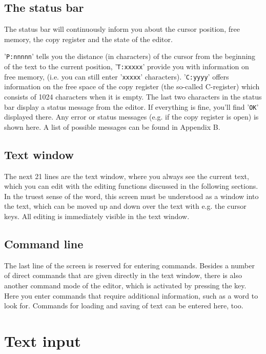 \documentclass[10pt,a4paper,twoside,final,openright,titlepage]{memoir}
\newcommand{\key}[1]{\keystroke{\tiny #1}}
\begin{document}
\subsection{The status bar}

The status bar will continuously inform you about the cursor position, free memory, the copy register
and the state of the editor.

'\texttt {P:nnnnn}' tells you the distance (in characters) of the cursor from the beginning of the text
to the current position,
'\texttt {T:xxxxx}' provide you with information on free memory, (i.e. you can still enter
'\texttt {xxxxx}' characters).
'\texttt {C:yyyy}' offers information on the free space of the copy register (the so-called C-register) 
which consists of 1024 characters when it is empty.
The last two characters in the status bar display a status message from the editor.
If everything is fine, you'll find '\texttt{OK}' displayed there.
Any error or status messages (e.g. if the copy register is open) is shown here.
A list of possible messages can be found in Appendix B.

\subsection{Text window}

The next 21 lines are the text window, where you always see the current text,
which you can edit with the editing functions discussed in the following sections.
In the truest sense of the word, this screen must be understood as a window into the text,
which can be moved up and down over the text with e.g. the cursor keys.
All editing is immediately visible in the text window.

\subsection{Command line}

The last line of the screen is reserved for entering commands.
Besides a number of direct commands that are given directly in the text window,
there is also another command mode of the editor, which is activated by pressing the \key{ESC} key.
Here you enter commands that require additional information, such as a word to look for.
Commands for loading and saving of text can be entered here, too.

\section{Text input}
\end{document}

